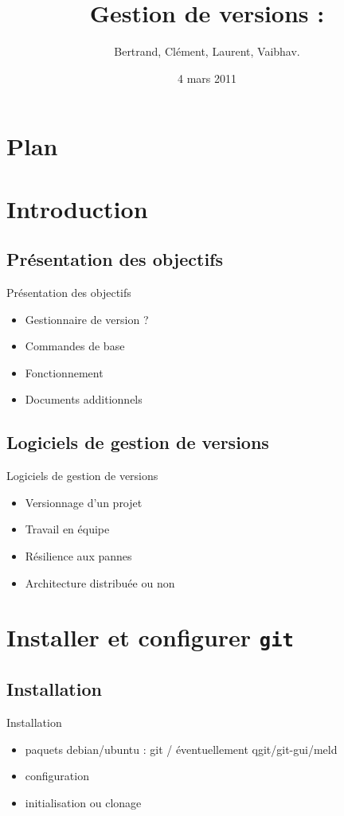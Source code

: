 \documentclass{beamer}
\title[ROSE]{Gestion de versions : \git}
\author{Bertrand, Clément, Laurent, Vaibhav.}
\institute{Télécom ParisTech}
\date{4 mars 2011}
\newcommand{\git}{\texttt{git}}
\begin{document}
\begin{frame}
  \titlepage
\end{frame}

\section*{Plan}

\section{Introduction}
\subsection*{Présentation des objectifs}
\begin{frame}{Présentation des objectifs}
  \begin{itemize}
  \item Gestionnaire de version ?
  \item Commandes de base
  \item Fonctionnement
  \item Documents additionnels
  \end{itemize}
\end{frame}

\subsection*{Logiciels de gestion de versions}
\begin{frame}{Logiciels de gestion de versions}
  \begin{itemize}
  \item Versionnage d'un projet
  \item Travail en équipe
  \item Résilience aux pannes
  \item Architecture distribuée ou non
  \end{itemize}
\end{frame}

\section{Installer et configurer \git}

\subsection*{Installation}
\begin{frame}{Installation}
  \begin{itemize}
  \item paquets debian/ubuntu : git / éventuellement qgit/git-gui/meld
  \item configuration
  \item initialisation ou clonage
  \end{itemize}
\end{frame}
\end{document}
